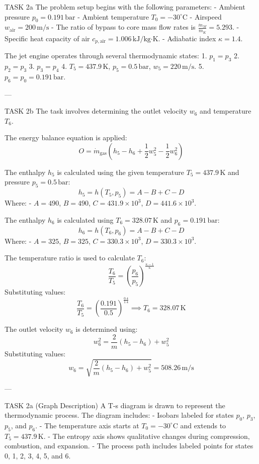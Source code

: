 TASK 2a  
The problem setup begins with the following parameters:  
- Ambient pressure \( p_0 = 0.191 \, \text{bar} \)  
- Ambient temperature \( T_0 = -30^\circ\text{C} \)  
- Airspeed \( w_{\text{air}} = 200 \, \text{m/s} \)  
- The ratio of bypass to core mass flow rates is \( \frac{\dot{m}_M}{\dot{m}_K} = 5.293 \).  
- Specific heat capacity of air \( c_{p,\text{air}} = 1.006 \, \text{kJ/kg·K} \).  
- Adiabatic index \( \kappa = 1.4 \).  

The jet engine operates through several thermodynamic states:  
1. \( p_1 = p_3 \)  
2. \( p_2 = p_3 \)  
3. \( p_3 = p_4 \)  
4. \( T_5 = 437.9 \, \text{K} \), \( p_5 = 0.5 \, \text{bar} \), \( w_5 = 220 \, \text{m/s} \).  
5. \( p_6 = p_0 = 0.191 \, \text{bar} \).  

---

TASK 2b  
The task involves determining the outlet velocity \( w_6 \) and temperature \( T_6 \).  

The energy balance equation is applied:  
\[
O = \dot{m}_{\text{gas}} \left( h_5 - h_6 + \frac{1}{2} w_5^2 - \frac{1}{2} w_6^2 \right)
\]

The enthalpy \( h_5 \) is calculated using the given temperature \( T_5 = 437.9 \, \text{K} \) and pressure \( p_5 = 0.5 \, \text{bar} \):  
\[
h_5 = h(T_5, p_5) = A - B + C - D
\]
Where:  
- \( A = 490 \), \( B = 490 \), \( C = 431.9 \times 10^3 \), \( D = 441.6 \times 10^3 \).  

The enthalpy \( h_6 \) is calculated using \( T_6 = 328.07 \, \text{K} \) and \( p_6 = 0.191 \, \text{bar} \):  
\[
h_6 = h(T_6, p_6) = A - B + C - D
\]
Where:  
- \( A = 325 \), \( B = 325 \), \( C = 330.3 \times 10^3 \), \( D = 330.3 \times 10^3 \).  

The temperature ratio is used to calculate \( T_6 \):  
\[
\frac{T_6}{T_5} = \left( \frac{p_6}{p_5} \right)^{\frac{\kappa - 1}{\kappa}}
\]
Substituting values:  
\[
\frac{T_6}{T_5} = \left( \frac{0.191}{0.5} \right)^{\frac{0.4}{1.4}} \implies T_6 = 328.07 \, \text{K}
\]

The outlet velocity \( w_6 \) is determined using:  
\[
w_6^2 = \frac{2}{m} \left( h_5 - h_6 \right) + w_5^2
\]
Substituting values:  
\[
w_6 = \sqrt{\frac{2}{m} \left( h_5 - h_6 \right) + w_5^2} = 508.26 \, \text{m/s}
\]  

---

TASK 2a (Graph Description)  
A T-s diagram is drawn to represent the thermodynamic process. The diagram includes:  
- Isobars labeled for states \( p_0 \), \( p_3 \), \( p_5 \), and \( p_6 \).  
- The temperature axis starts at \( T_0 = -30^\circ\text{C} \) and extends to \( T_5 = 437.9 \, \text{K} \).  
- The entropy axis shows qualitative changes during compression, combustion, and expansion.  
- The process path includes labeled points for states 0, 1, 2, 3, 4, 5, and 6.  
